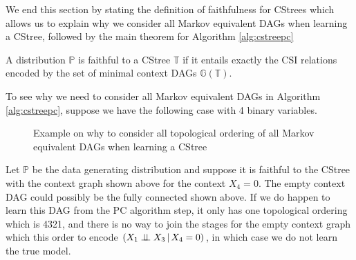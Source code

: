 \documentclass{tufte-book}
\begin{document}
\begin{Definition}



We end this section by stating the definition of faithfulness for CStrees which allows us to explain why we consider all Markov equivalent DAGs when learning a CStree, followed by the main theorem for Algorithm \ref{alg:cstreepc}

\begin{definition}\label{def:faithfulnesscstrees}
A distribution $\mathbb{P}$ is faithful to a CStree $\mathbb{T}$ if it entails exactly the CSI relations encoded by the set of minimal context DAGs $\mathbb{G}(\mathbb{T})$.
\end{definition}

To see why we need to consider all Markov equivalent DAGs in Algorithm \ref{alg:cstreepc}, suppose we have the following case with 4 binary variables.


\begin{figure}[!h]\label{fig:dagtocstree_cstree}
   \begin{floatrow}
%
\caption{Example on why to consider all topological ordering of all Markov equivalent DAGs when learning a CStree}
        
   \end{floatrow}
\end{figure}


Let \(\mathbb{P}\) be the data generating distribution and suppose it is faithful to the CStree with the context graph shown above for the context \(X_4=0\). The empty context DAG could possibly be the fully connected shown above. If we do happen to learn this DAG from the PC algorithm step, it only has one topological ordering which is 4321, and there is no way to join the stages for the empty context graph which this order to encode \((X_1 \perp \!\!\! \perp X_3 \,|\,X_4=0)\), in which case we do not learn the true model.



\end{Definition}
\end{document}

